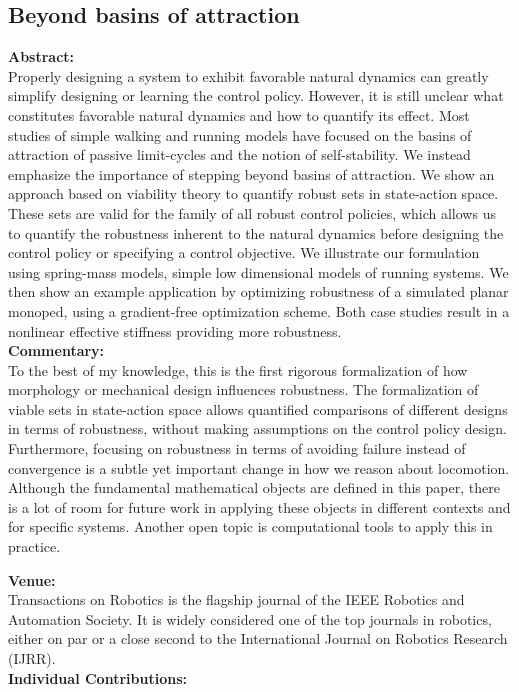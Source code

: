 \subsection{Beyond basins of attraction}
\textbf{Abstract: } \\
Properly designing a system to exhibit favorable natural dynamics can greatly simplify designing or learning the control policy. However, it is still unclear what constitutes favorable natural dynamics and how to quantify its effect. Most studies of simple walking and running models have focused on the basins of attraction of passive limit-cycles and the notion of self-stability. We instead emphasize the importance of stepping beyond basins of attraction. We show an approach based on viability theory to quantify robust sets in state-action space. These sets are valid for the family of all robust control policies, which allows us to quantify the robustness inherent to the natural dynamics before designing the control policy or specifying a control objective.
We illustrate our formulation using spring-mass models, simple low dimensional models of running systems. We then show an example application by optimizing robustness of a simulated planar monoped, using a gradient-free optimization scheme. Both case studies result in a nonlinear effective stiffness providing more robustness. \\
\textbf{Commentary: } \\
To the best of my knowledge, this is the first rigorous formalization of how morphology or mechanical design influences robustness. The formalization of viable sets in state-action space allows quantified comparisons of different designs in terms of robustness, without making assumptions on the control policy design. Furthermore, focusing on robustness in terms of avoiding failure instead of convergence is a subtle yet important change in how we reason about locomotion. Although the fundamental mathematical objects are defined in this paper, there is a lot of room for future work in applying these objects in different contexts and for specific systems. Another open topic is computational tools to apply this in practice. \par
\textbf{Venue: } \\
Transactions on Robotics is the flagship journal of the IEEE Robotics and Automation Society. It is widely considered one of the top journals in robotics, either on par or a close second to the International Journal on Robotics Research (IJRR). \\
\textbf{Individual Contributions: } \\
